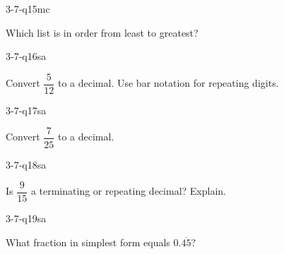 \begin{practiceQuestion}{3-7-q15}{mc}
\begin{questionText}
Which list is in order from least to greatest?
\end{questionText}
\end{practiceQuestion}


\begin{practiceQuestion}{3-7-q16}{sa}
\begin{questionText}
Convert $\dfrac{5}{12}$ to a decimal. Use bar notation for repeating digits.
\end{questionText}
\end{practiceQuestion}

\begin{practiceQuestion}{3-7-q17}{sa}
\begin{questionText}
Convert $\dfrac{7}{25}$ to a decimal.
\end{questionText}
\end{practiceQuestion}

\begin{practiceQuestion}{3-7-q18}{sa}
\begin{questionText}
Is $\dfrac{9}{15}$ a terminating or repeating decimal? Explain.
\end{questionText}
\end{practiceQuestion}

\begin{practiceQuestion}{3-7-q19}{sa}
\begin{questionText}
What fraction in simplest form equals $0.\overline{45}$?
\end{questionText}
\end{practiceQuestion}

